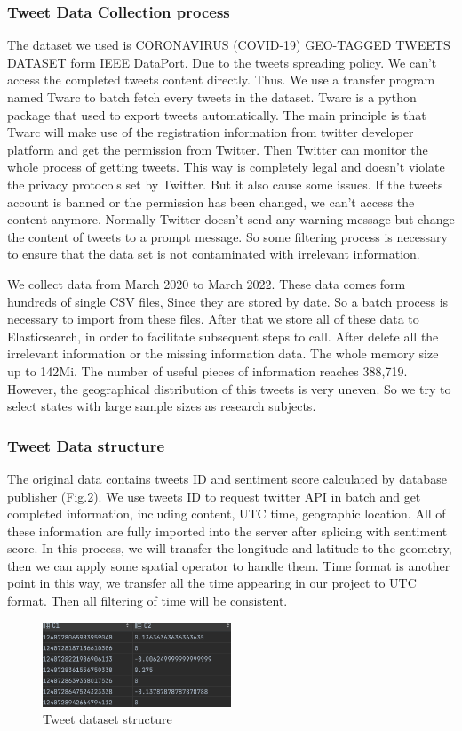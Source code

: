 \subsubsection{Tweet Data Collection process}
The dataset we used is CORONAVIRUS (COVID-19) GEO-TAGGED TWEETS DATASET form
IEEE DataPort. Due to the tweets spreading policy. We can't access the
completed tweets content directly.  Thus. We use a transfer program named
Twarc to batch fetch every tweets in the dataset. Twarc is a python package
that used to export tweets automatically.  The main principle is that Twarc
will make use of the registration information from twitter developer platform
and get the permission from Twitter. Then Twitter can monitor the whole
process of getting tweets. This way is completely legal and doesn't violate
the privacy protocols set by Twitter. But it also cause some issues. If the
tweets account is banned or the permission has been changed, we can't access
the content anymore. Normally Twitter doesn't send any warning message but
change the content of tweets to a prompt message. So some filtering process
is necessary to ensure that the data set is not contaminated with irrelevant
information. 

We collect data from March 2020 to March 2022. These data comes form hundreds
of single CSV files, Since they are stored by date. So a batch process is
necessary to import from these files. After that we store all of these data
to Elasticsearch, in order to facilitate subsequent steps to call. After
delete all the irrelevant information or the missing information data. The
whole memory size up to 142Mi. The number of useful pieces of information
reaches 388,719. However, the geographical distribution of this tweets is
very uneven. So we try to select states with large sample sizes as research
subjects. 

\subsubsection{Tweet Data structure}
The original data contains tweets ID and sentiment score calculated by
database publisher (Fig.2). We use tweets ID to request twitter API in batch
and get completed information, including content, UTC time, geographic
location. All of these information are fully imported into the server after
splicing with sentiment score.  In this process, we will transfer the
longitude and latitude to the geometry, then we can apply some spatial
operator to handle them. Time format is another point in this way, we
transfer all the time appearing in our project to UTC format. Then all
filtering of time will be consistent. 
\begin{figure}[h]
\centering
\includegraphics[width=0.5\textwidth]{imgs/row_tweets.png}
\caption{\label{fig:Research process}Tweet dataset structure}
\end{figure}
